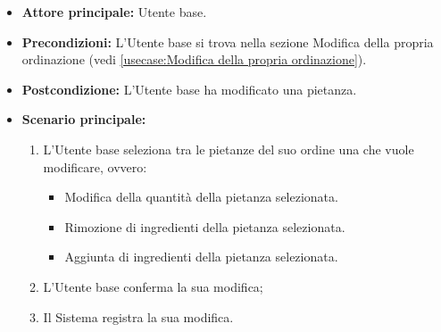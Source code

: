 \label{usecase:Modifica pietanza}
\begin{itemize}
	\item \textbf{Attore principale:} Utente base.

	\item \textbf{Precondizioni:}  L'Utente base si trova nella sezione Modifica della propria ordinazione (vedi \autoref{usecase:Modifica della propria ordinazione}).


	\item \textbf{Postcondizione:} L'Utente base ha modificato una pietanza.

	\item \textbf{Scenario principale:}
	      \begin{enumerate}
		      \item L'Utente base seleziona tra le pietanze del suo ordine una che vuole modificare, ovvero:
		      \begin{itemize}
				\item Modifica della quantità della pietanza selezionata.
				\item Rimozione di ingredienti della pietanza selezionata.
				\item Aggiunta di ingredienti della pietanza selezionata.
			  \end{itemize}
		      \item L'Utente base conferma la sua modifica;
		      \item Il Sistema registra la sua modifica.
	      \end{enumerate}
\end{itemize}